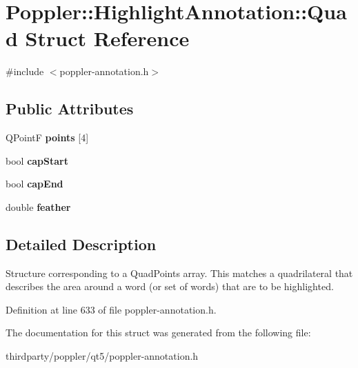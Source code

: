 \hypertarget{struct_poppler_1_1_highlight_annotation_1_1_quad}{}\section{Poppler\+:\+:Highlight\+Annotation\+:\+:Quad Struct Reference}
\label{struct_poppler_1_1_highlight_annotation_1_1_quad}


{\ttfamily \#include $<$poppler-\/annotation.\+h$>$}

\subsection*{Public Attributes}
\begin{DoxyCompactItemize}
\item 
\mbox{\label{struct_poppler_1_1_highlight_annotation_1_1_quad_af4a8ebdea91a13bf80e99178f30a866d}} 
Q\+PointF {\bfseries points} \mbox{[}4\mbox{]}
\item 
\mbox{\label{struct_poppler_1_1_highlight_annotation_1_1_quad_ad5cf92359315aba814b37207463fc0fc}} 
bool {\bfseries cap\+Start}
\item 
\mbox{\label{struct_poppler_1_1_highlight_annotation_1_1_quad_ab092b7099a71bca76be72866871a6e9b}} 
bool {\bfseries cap\+End}
\item 
\mbox{\label{struct_poppler_1_1_highlight_annotation_1_1_quad_ab47069a17df6d4a8fd504579b07989ec}} 
double {\bfseries feather}
\end{DoxyCompactItemize}


\subsection{Detailed Description}
Structure corresponding to a Quad\+Points array. This matches a quadrilateral that describes the area around a word (or set of words) that are to be highlighted. 

Definition at line 633 of file poppler-\/annotation.\+h.



The documentation for this struct was generated from the following file\+:\begin{DoxyCompactItemize}
\item 
thirdparty/poppler/qt5/poppler-\/annotation.\+h\end{DoxyCompactItemize}

